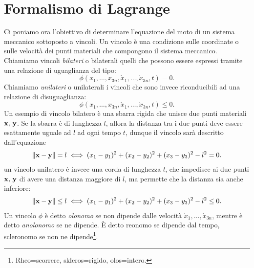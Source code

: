 \chapter{Formalismo di Lagrange}
   Ci poniamo ora l'obiettivo di determinare l'equazione del moto di un sistema meccanico sottoposto a vincoli. Un vincolo è una condizione sulle coordinate o sulle velocità dei punti materiali che compongono il sistema meccanico. Chiamiamo vincoli \emph{bilateri} o bilaterali quelli che possono essere espressi tramite una relazione di uguaglianza del tipo:
   \begin{equation}
       \phi(x_1,\dots, x_{3n},\dot{x}_1,\dots, \dot{x}_{3n},t) = 0.
   \end{equation}
   Chiamiamo \emph{unilateri} o unilaterali i vincoli che sono invece riconducibili ad una relazione di disuguaglianza:
    \begin{equation}
       \phi(x_1,\dots, x_{3n},\dot{x}_1,\dots, \dot{x}_{3n},t) \leq 0.
   \end{equation}
   Un esempio di vincolo bilatero è una sbarra rigida che unisce due punti materiali
    $\mathbf{x},\,\mathbf{y}$. Se la sbarra è di lunghezza $l$, 
    allora la distanza tra i due punti deve essere
    esattamente uguale ad $l$ ad ogni tempo $t$, dunque il vincolo sarà descritto dall'equazione
   \begin{equation}
       \|\mathbf{x}-\mathbf{y}\|=l \iff (x_1-y_1)^2 + (x_2-y_2)^2+(x_3-y_3)^2 -l^2 = 0.
   \end{equation}
   un vincolo unilatero è invece una corda di lunghezza $l$, che impedisce ai due punti $\mathbf{x},\,\mathbf{y}$ di avere una distanza maggiore di $l$, ma permette che la distanza sia anche inferiore:
   \begin{equation}
       \|\mathbf{x}-\mathbf{y}\| \leq l \iff  (x_1-y_1)^2 + (x_2-y_2)^2+(x_3-y_3)^2 -l ^2\leq 0.
   \end{equation}
   Un vincolo $\phi$ è detto \emph{olonomo} se non dipende dalle velocità $\dot{x}_1,\dots,\dot{x}_{3n}$, mentre è detto \emph{anolonomo} se ne dipende. È detto reonomo se dipende dal tempo, scleronomo se non ne dipende\footnote{Rheo=scorrere, skleros=rigido, olos=intero.}.

